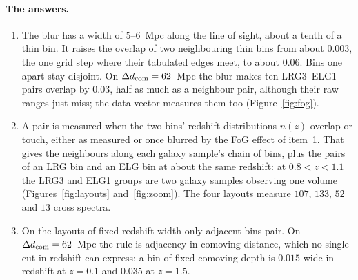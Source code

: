 \documentclass[11pt]{article}
\newcommand{\dcom}{$\Delta d_{\rm com} = 62$~Mpc}
\begin{document}
\paragraph{The answers.}
\begin{enumerate}
  \item The blur has a width of $5$--$6$~Mpc along the line of sight,
    about a tenth of a thin bin.  It raises the overlap of two
    neighbouring thin bins from about $0.003$, the one grid step where
    their tabulated edges meet, to about $0.06$.  Bins one apart stay
    disjoint.  On \dcom{} the blur makes ten LRG3--ELG1 pairs overlap
    by $0.03$, half as much as a neighbour pair, although their raw
    ranges just miss; the data vector measures them too
    (Figure~\ref{fig:fog}).
  \item A pair is measured when the two bins' redshift distributions
    $n(z)$ overlap or touch, either as measured or once blurred by the
    FoG effect of item~1.  That gives the neighbours along each galaxy
    sample's chain of bins, plus the pairs of an LRG bin and an ELG bin
    at about the same redshift: at $0.8 < z < 1.1$ the LRG3 and ELG1
    groups are two galaxy samples observing one volume
    (Figures~\ref{fig:layouts} and~\ref{fig:zoom}).  The four layouts
    measure $107$, $133$, $52$ and $13$ cross spectra.
  \item On the layouts of fixed redshift width only adjacent bins pair.
    On \dcom{} the rule is adjacency in comoving distance, which no
    single cut in redshift can express: a bin of fixed comoving depth
    is $0.015$ wide in redshift at $z = 0.1$ and $0.035$ at $z = 1.5$.
\end{enumerate}
\end{document}
